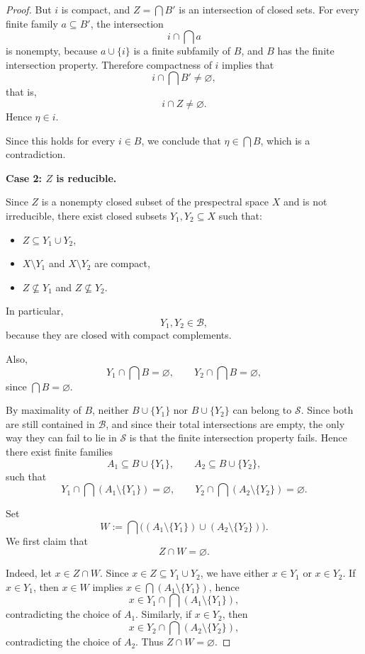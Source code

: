 \documentclass{article}
\begin{document}
\begin{proof}
But \(i\) is compact, and \(Z=\bigcap B'\) is an intersection of closed sets. For every finite
family \(a \subseteq B'\), the intersection
\[
i \cap \bigcap a
\]
is nonempty, because \(a \cup \{i\}\) is a finite subfamily of \(B\), and \(B\) has the finite
intersection property. Therefore compactness of \(i\) implies that
\[
i \cap \bigcap B' \neq \varnothing,
\]
that is,
\[
i \cap Z \neq \varnothing.
\]
Hence \(\eta \in i\).

Since this holds for every \(i \in B\), we conclude that \(\eta \in \bigcap B\), which is a contradiction.

\noindent\textbf{Case 2: \(Z\) is reducible.}

Since \(Z\) is a nonempty closed subset of the prespectral space \(X\) and is not irreducible,
there exist closed subsets \(Y_1, Y_2 \subseteq X\) such that:

\begin{itemize}
  \item \(Z \subseteq Y_1 \cup Y_2\),
  \item \(X \setminus Y_1\) and \(X \setminus Y_2\) are compact,
  \item \(Z \nsubseteq Y_1\) and \(Z \nsubseteq Y_2\).
\end{itemize}

In particular,
\[
Y_1, Y_2 \in \mathcal B,
\]
because they are closed with compact complements.

Also,
\[
Y_1 \cap \bigcap B = \varnothing,
\qquad
Y_2 \cap \bigcap B = \varnothing,
\]
since \(\bigcap B=\varnothing\).

By maximality of \(B\), neither \(B \cup \{Y_1\}\) nor \(B \cup \{Y_2\}\) can belong to
\(\mathcal S\). Since both are still contained in \(\mathcal B\), and since their total
intersections are empty, the only way they can fail to lie in \(\mathcal S\) is that the
finite intersection property fails. Hence there exist finite families
\[
A_1 \subseteq B \cup \{Y_1\},
\qquad
A_2 \subseteq B \cup \{Y_2\},
\]
such that
\[
Y_1 \cap \bigcap (A_1 \setminus \{Y_1\}) = \varnothing,
\qquad
Y_2 \cap \bigcap (A_2 \setminus \{Y_2\}) = \varnothing.
\]

Set
\[
W := \bigcap\bigl((A_1 \setminus \{Y_1\}) \cup (A_2 \setminus \{Y_2\})\bigr).
\]
We first claim that
\[
Z \cap W = \varnothing.
\]

Indeed, let \(x \in Z \cap W\). Since \(x \in Z \subseteq Y_1 \cup Y_2\), we have either
\(x \in Y_1\) or \(x \in Y_2\). If \(x \in Y_1\), then \(x \in W\) implies \(x \in \bigcap(A_1 \setminus \{Y_1\})\), hence
\[
x \in Y_1 \cap \bigcap(A_1 \setminus \{Y_1\}),
\]
contradicting the choice of \(A_1\). Similarly, if \(x \in Y_2\), then
\[
x \in Y_2 \cap \bigcap(A_2 \setminus \{Y_2\}),
\]
contradicting the choice of \(A_2\). Thus \(Z \cap W = \varnothing\).


\end{proof}
\end{document}
